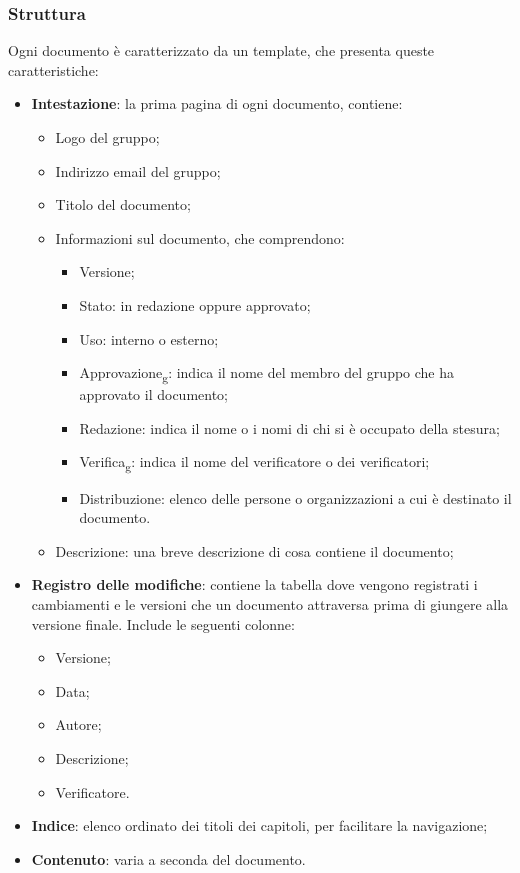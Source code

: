 \subsubsection{Struttura}
Ogni documento è caratterizzato da un template, che presenta queste
caratteristiche:
\begin{itemize}
      \item \textbf{Intestazione}: la prima pagina di ogni documento, contiene:
            \begin{itemize}
                  \item Logo del gruppo;
                  \item Indirizzo email del gruppo;
                  \item Titolo del documento;
                  \item Informazioni sul documento, che comprendono:
                        \begin{itemize}
                              \item Versione;
                              \item Stato: in redazione oppure approvato;
                              \item Uso: interno o esterno;
                              \item Approvazione\textsubscript{g}: indica il nome del membro del gruppo che ha
                                    approvato il documento;
                              \item Redazione: indica il nome o i nomi di chi si è occupato della stesura;
                              \item Verifica\textsubscript{g}: indica il nome del verificatore o dei verificatori;
                              \item Distribuzione: elenco delle persone o organizzazioni a cui è destinato il
                                    documento.
                        \end{itemize}
                  \item Descrizione: una breve descrizione di cosa contiene il documento;
            \end{itemize}
      \item \textbf{Registro delle modifiche}: contiene la tabella dove vengono registrati i cambiamenti e le versioni
            che un documento attraversa prima di giungere alla versione finale. Include le seguenti colonne:
            \begin{itemize}
                  \item Versione;
                  \item Data;
                  \item Autore;
                  \item Descrizione;
                  \item Verificatore.
            \end{itemize}
      \item \textbf{Indice}: elenco ordinato dei titoli dei capitoli, per facilitare la navigazione;
      \item \textbf{Contenuto}: varia a seconda del documento.
\end{itemize}
